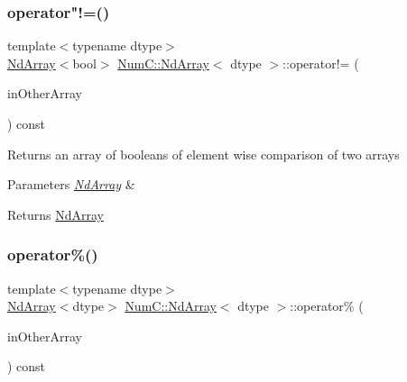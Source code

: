 \subsubsection{\texorpdfstring{operator"!=()}{operator!=()}\hspace{0.1cm}{\footnotesize\ttfamily [2/2]}}
{\footnotesize\ttfamily template$<$typename dtype$>$ \\
\mbox{\hyperlink{class_num_c_1_1_nd_array}{Nd\+Array}}$<$bool$>$ \mbox{\hyperlink{class_num_c_1_1_nd_array}{Num\+C\+::\+Nd\+Array}}$<$ dtype $>$\+::operator!= (\begin{DoxyParamCaption}\item[{const \mbox{\hyperlink{class_num_c_1_1_nd_array}{Nd\+Array}}$<$ dtype $>$ \&}]{in\+Other\+Array }\end{DoxyParamCaption}) const\hspace{0.3cm}{\ttfamily [inline]}}

Returns an array of booleans of element wise comparison of two arrays


\begin{DoxyParams}{Parameters}
{\em \mbox{\hyperlink{class_num_c_1_1_nd_array}{Nd\+Array}}} & \\
\hline
\end{DoxyParams}
\begin{DoxyReturn}{Returns}
\mbox{\hyperlink{class_num_c_1_1_nd_array}{Nd\+Array}} 
\end{DoxyReturn}
\mbox{\label{class_num_c_1_1_nd_array_a61f33df532c6205509d462a60e0d292b}} 
\subsubsection{\texorpdfstring{operator\%()}{operator\%()}\hspace{0.1cm}{\footnotesize\ttfamily [1/2]}}
{\footnotesize\ttfamily template$<$typename dtype$>$ \\
\mbox{\hyperlink{class_num_c_1_1_nd_array}{Nd\+Array}}$<$dtype$>$ \mbox{\hyperlink{class_num_c_1_1_nd_array}{Num\+C\+::\+Nd\+Array}}$<$ dtype $>$\+::operator\% (\begin{DoxyParamCaption}\item[{const \mbox{\hyperlink{class_num_c_1_1_nd_array}{Nd\+Array}}$<$ dtype $>$ \&}]{in\+Other\+Array }\end{DoxyParamCaption}) const\hspace{0.3cm}{\ttfamily [inline]}}

